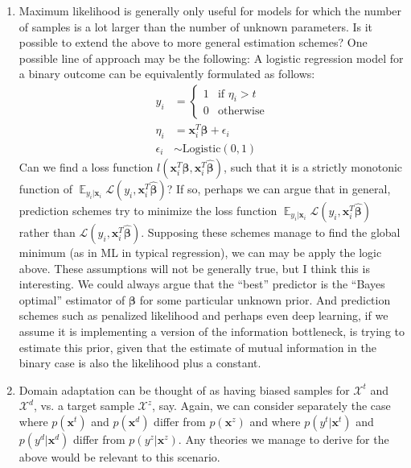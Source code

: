 \documentclass[12pt]{article}
\DeclareMathOperator{\E}{\mathbb{E}}
\begin{document}
\begin{enumerate}
		\item Maximum likelihood is generally only useful for models for which the number of samples is a lot larger than the number of unknown parameters. Is it possible to extend the above to more general estimation schemes? One possible line of approach may be the following: A logistic regression model for a binary outcome can be equivalently formulated as follows: 
		\begin{align}
			y_i &= \begin{cases}
			1 & \text{if } \eta_i > t \\
			0 & \text{otherwise} 
			\end{cases} \\
			\eta_i &= \boldsymbol{x}_i^T\boldsymbol{\beta} + \epsilon_i \\
			\epsilon_i &\sim \text{Logistic}(0,1)
		\end{align}
		Can we find a loss function $l(\boldsymbol{x}_i^T\boldsymbol{\beta}, \boldsymbol{x}_i^T\hat{\boldsymbol{\beta}})$, such that it is a strictly monotonic function of $\E_{y_i|\boldsymbol{x}_i} \mathcal{L}(y_i, \boldsymbol{x}_i^T\hat{\boldsymbol{\beta}})$? If so, perhaps we can argue that in general, prediction schemes try to minimize the loss function $\E_{y_i|\boldsymbol{x}_i} \mathcal{L}(y_i, \boldsymbol{x}_i^T\hat{\boldsymbol{\beta}})$ rather than $\mathcal{L}(y_i, \boldsymbol{x}_i^T\hat{\boldsymbol{\beta}})$. Supposing these schemes manage to find the global minimum (as in ML in typical regression), we can may be apply the logic above. These assumptions will not be generally true, but I think this is interesting. We could always argue that the ``best'' predictor is the ``Bayes optimal'' estimator of $\boldsymbol{\beta}$ for some particular unknown prior. And prediction schemes such as penalized likelihood and perhaps even deep learning, if we assume it is implementing a version of the information bottleneck, is trying to estimate this prior, given that the estimate of mutual information in the binary case is also the likelihood plus a constant. 
		\item Domain adaptation can be thought of as having biased samples for $\mathcal{X}^t$ and $\mathcal{X}^d$, vs. a target sample $\mathcal{X}^z$, say. Again, we can consider separately the case where $p(\boldsymbol{x}^t)$ and $p(\boldsymbol{x}^d)$ differ from $p(\boldsymbol{x}^z)$ and where $p(y^t|\boldsymbol{x}^t)$ and $p(y^d|\boldsymbol{x}^d)$ differ from $p(y^z|\boldsymbol{x}^z)$. Any theories we manage to derive for the above would be relevant to this scenario. 
	\end{enumerate}
	

	
\end{document}
